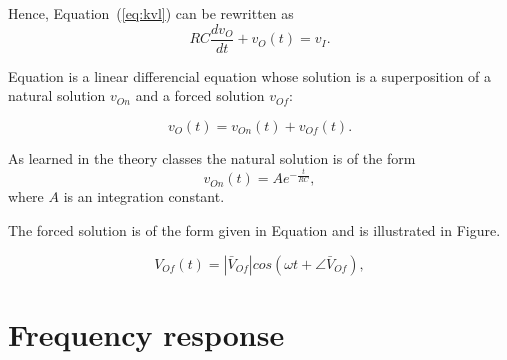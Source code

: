Hence, Equation~(\ref{eq:kvl}) can be rewritten as
\begin{equation}
  RC\frac{dv_O}{dt} + v_O(t) = v_I.
  \label{eq:kvl2}
\end{equation}

Equation is a linear differencial equation whose solution is a
superposition of a natural solution $v_{On}$ and a forced solution $v_{Of}$:

\begin{equation}
  v_O(t) = v_{On}(t) + v_{Of}(t).
  \label{eq:vo_sol}
\end{equation}

As learned in the theory classes the natural solution is of the form
\begin{equation}
  v_{On}(t) = Ae^{-\frac{t}{RC}},
  \label{eq:vo_nat}
\end{equation}
where $A$ is an integration constant.

The forced solution is of the form given in Equation and is
illustrated in Figure.

\begin{equation}
  V_{Of}(t) = |\bar{V}_{Of}| cos(\omega t + \angle \bar{V}_{Of}),
  \label{eq:vo_for}
\end{equation}

\lipsum[1-1]



\section{Frequency response}

\lipsum[1-1]


